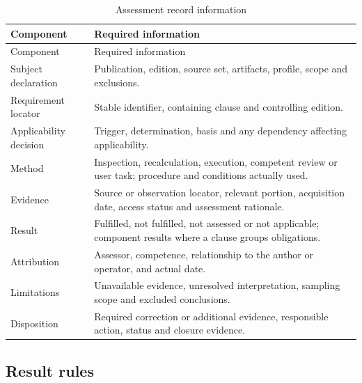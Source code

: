 \documentclass[11pt,a4paper]{article}
\begin{document}
\begin{longtable}{L{0.24\textwidth}L{0.68\textwidth}}
\caption{Assessment record information}\label{tab:assessment-record}\\
\toprule Component & Required information\\\midrule\endfirsthead
\toprule Component & Required information\\\midrule\endhead
Subject declaration & Publication, edition, source set, artifacts, profile, scope and exclusions.\\
Requirement locator & Stable identifier, containing clause and controlling edition.\\
Applicability decision & Trigger, determination, basis and any dependency affecting applicability.\\
Method & Inspection, recalculation, execution, competent review or user task; procedure and conditions actually used.\\
Evidence & Source or observation locator, relevant portion, acquisition date, access status and assessment rationale.\\
Result & Fulfilled, not fulfilled, not assessed or not applicable; component results where a clause groups obligations.\\
Attribution & Assessor, competence, relationship to the author or operator, and actual date.\\
Limitations & Unavailable evidence, unresolved interpretation, sampling scope and excluded conclusions.\\
Disposition & Required correction or additional evidence, responsible action, status and closure evidence.\\
\bottomrule
\end{longtable}

\subsection{Result rules}
\end{document}

